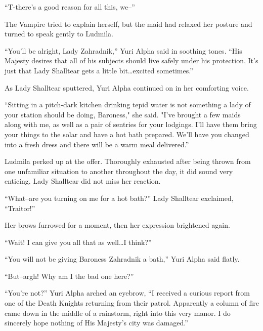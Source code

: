  

“T-there’s a good reason for all this, we–”

 

The Vampire tried to explain herself, but the maid had relaxed her posture and turned to speak gently to Ludmila.

 

“You’ll be alright, Lady Zahradnik,” Yuri Alpha said in soothing tones. “His Majesty desires that all of his subjects should live safely under his protection. It’s just that Lady Shalltear gets a little bit…excited sometimes.”

 

As Lady Shalltear sputtered, Yuri Alpha continued on in her comforting voice.

 

“Sitting in a pitch-dark kitchen drinking tepid water is not something a lady of your station should be doing, Baroness," she said. "I've brought a few maids along with me, as well as a pair of sentries for your lodgings. I'll have them bring your things to the solar and have a hot bath prepared. We'll have you changed into a fresh dress and there will be a warm meal delivered.”

 

Ludmila perked up at the offer. Thoroughly exhausted after being thrown from one unfamiliar situation to another throughout the day, it did sound very enticing. Lady Shalltear did not miss her reaction.

 

“What–are you turning on me for a hot bath?” Lady Shalltear exclaimed, “Traitor!”

 

Her brows furrowed for a moment, then her expression brightened again.

 

“Wait! I can give you all that as well…I think?”

 

“You will not be giving Baroness Zahradnik a bath,” Yuri Alpha said flatly.

 

“But–argh! Why am I the bad one here?”

 

“You’re not?” Yuri Alpha arched an eyebrow, “I received a curious report from one of the Death Knights returning from their patrol. Apparently a column of fire came down in the middle of a rainstorm, right into this very manor. I do sincerely hope nothing of His Majesty’s city was damaged.”

